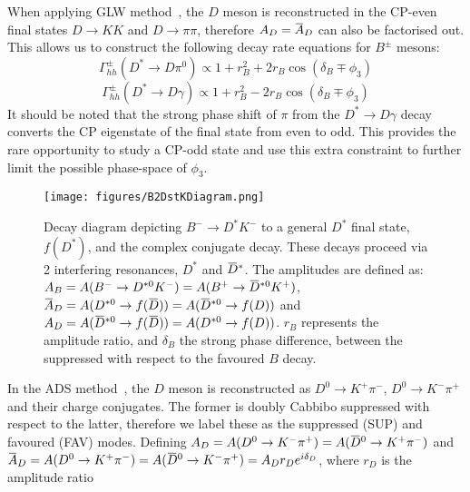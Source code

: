 \documentclass[oneside,12pt]{article}
\newcommand{\overbar}[1]{\mkern 1.5mu\overline{\mkern-1.5mu#1\mkern-1.5mu}\mkern
1.5mu}
\begin{document}
When applying GLW method~\cite{GLWRef}, the $D$ meson is reconstructed in the
CP-even final states $D\rightarrow KK$ and $D\rightarrow \pi \pi$, therefore
$A_{D}=\overbar{A}_{D}$ can also be factorised out. This allows us to construct
the following decay rate equations for $B^{\pm}$ mesons:
  \begin{equation}
    \Gamma_{hh}^{\pm}(D^{*}\rightarrow D\pi^{0})\propto 1 + r_{B}^{2} +
    2r_{B}\cos(\delta_{B}\mp \phi_{3}) \label{eq:DecayRateGLWpi0}
  \end{equation}
  \begin{equation}
    \Gamma_{hh}^{\pm}(D^{*}\rightarrow D\gamma)\propto 1 + r_{B}^{2} -
    2r_{B}\cos(\delta_{B}\mp \phi_{3}) \label{eq:DecayRateGLWgamma}
  \end{equation}
\noindent It should be noted that the strong phase shift of $\pi$ from the
$D^{*}\rightarrow D\gamma$ decay converts the CP eigenstate of the final state
from even to odd. This provides the rare opportunity to study a CP-odd state and
use this extra constraint to further limit the possible phase-space of $\phi_3$. 
\begin{figure}[H]
  \centering \texttt{[image: figures/B2DstKDiagram.png]}
  \caption{\small{Decay diagram depicting ${B}^{-}\rightarrow{D}^{*}{K}^{-}$ to
  a general $D^{*}$ final state, $f(D^{*})$, and the complex conjugate decay.
  These decays proceed via 2 interfering resonances, $D^{*}$ and
  $\overbar{D}^{*}$. The amplitudes are defined as: $A_{B}=A(B^{-}\rightarrow
  D^{*0}K^{-})=A(B^{+}\rightarrow \overbar{D}^{*0}K^{+})$,
  $\overbar{A}_{D}=A(D^{*0}\rightarrow
  f(\overbar{D}))=A(\overbar{D}^{*0}\rightarrow f(D))$ and
  $A_{D}=A(\overbar{D}^{*0}\rightarrow f(\overbar{D}))=A(D^{*0}\rightarrow
  f(D))$. $r_{B}$ represents the amplitude ratio, and $\delta_{B}$ the strong
  phase difference, between the suppressed with respect to the favoured $B$
  decay.}} \label{fig:B2DstKDiagram} \vspace{-10pt}
\end{figure}
In the ADS method~\cite{ADSRef}, the $D$ meson is reconstructed as
$D^{0}\rightarrow K^{+}\pi^{-}$, $D^{0}\rightarrow K^{-}\pi^{+}$ and their
charge conjugates. The former is doubly Cabbibo suppressed with respect to the
latter, therefore we label these as the suppressed (SUP) and favoured (FAV)
modes. Defining $A_{D}=A(D^{0}\rightarrow
K^{-}\pi^{+})=A(\overbar{D}^{0}\rightarrow K^{+}\pi^{-})$ and $\overbar{A}_{D}=
A(D^{0}\rightarrow K^{+}\pi^{-})=A(\overbar{D}^{0}\rightarrow
K^{-}\pi^{+})=A_{D}r_{D}e^{i\delta_{D}}$, where $r_{D}$ is the amplitude ratio
\end{document}
